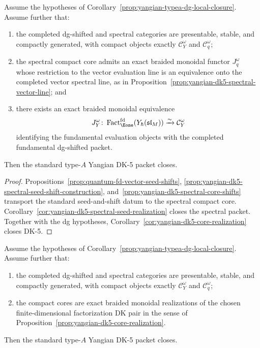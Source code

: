 \begin{corollary}
\label{cor:yangian-dk5-dg-half-only}
Assume the hypotheses of
Corollary~\ref{prop:yangian-typea-dg-local-closure}. Assume further
that:
\begin{enumerate}[label=\textup{(\roman*)}]
\item the completed dg-shifted and spectral categories are presentable,
 stable, and compactly generated, with compact objects exactly
 \(\mathcal{C}_Y^\omega\) and \(\mathcal{C}_q^\omega\);
\item the spectral compact core admits an exact braided monoidal
 functor \(J_q^\omega\) whose restriction to the vector evaluation
 line is an equivalence onto the completed vector spectral line, as in
 Proposition~\ref{prop:yangian-dk5-spectral-vector-line}; and
\item there exists an exact braided monoidal equivalence
 \[
 J_Y^\omega\colon
 \operatorname{Fact}_{\Eone}^{\mathrm{fd}}(Y_\hbar(\mathfrak{sl}_M))
 \xrightarrow{\sim}
 \mathcal{C}_Y^\omega
 \]
 identifying the fundamental evaluation objects with the completed
 fundamental dg-shifted packet.
\end{enumerate}
Then the standard type-$A$ Yangian DK-5 packet closes.

\end{corollary}

\begin{proof}
Propositions~\ref{prop:quantum-fd-vector-seed-shifts},
\ref{prop:yangian-dk5-spectral-seed-shift-construction},
and~\ref{prop:yangian-dk5-spectral-core-shifts} transport the standard
seed-and-shift datum to the spectral compact core.
Corollary~\ref{cor:yangian-dk5-spectral-seed-realization} closes the
spectral packet. Together with the dg hypotheses,
Corollary~\ref{cor:yangian-dk5-core-realization} closes DK-5.
\end{proof}

\begin{corollary}
\label{cor:yangian-dk5-core-realization}
Assume the hypotheses of
Corollary~\ref{prop:yangian-typea-dg-local-closure}. Assume further
that:
\begin{enumerate}[label=\textup{(\roman*)}]
\item the completed dg-shifted and spectral categories are presentable,
 stable, and compactly generated, with compact objects exactly
 $\mathcal{C}_Y^\omega$ and $\mathcal{C}_q^\omega$;
\item the compact cores are exact braided monoidal realizations of the
 chosen finite-dimensional factorization DK pair in the sense of
 Proposition~\ref{prop:yangian-dk5-core-realization}.
\end{enumerate}
Then the standard type-$A$ Yangian DK-5 packet closes.

\end{corollary}

